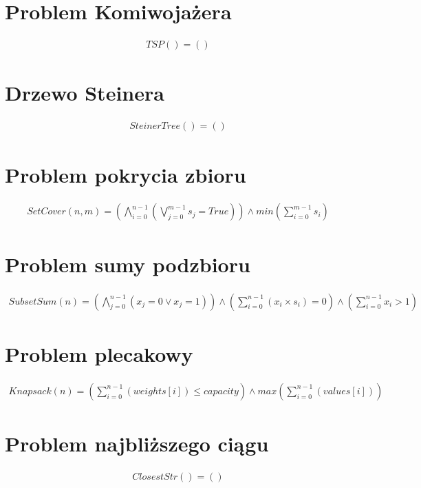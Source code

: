 \section{Problem Komiwojażera}

\begin{align*}
	TSP() = \left(  \right) 
\end{align*}

\section{Drzewo Steinera}

\begin{align*}
	SteinerTree() = \left(  \right) 
\end{align*}

\section{Problem pokrycia zbioru}

\begin{align*}
	SetCover(n, m) = \left( \bigwedge_{i=0}^{n-1} (\bigvee_{j=0}^{m-1} s_j = True) \right) \land 
	min \left( \sum_{i=0}^{m-1} s_i \right) 
\end{align*}

\section{Problem sumy podzbioru}

\begin{align*}
	SubsetSum(n) = \left( \bigwedge_{j=0}^{n-1} (x_j = 0 \lor x_j = 1) \right) \land 
	\left( \sum_{i=0}^{n-1} (x_i \times s_i) = 0 \right) \land 
	\left( \sum_{i=0}^{n-1} x_i > 1 \right)
\end{align*}

\section{Problem plecakowy}

\begin{align*}
	Knapsack(n) = \left( \sum_{i=0}^{n-1} (weights[i]) \leq capacity \right) \land 
	max \left( \sum_{i=0}^{n-1} (values[i]) \right)
\end{align*}

\section{Problem najbliższego ciągu}

\begin{align*}
	ClosestStr() = \left(  \right) 
\end{align*}
